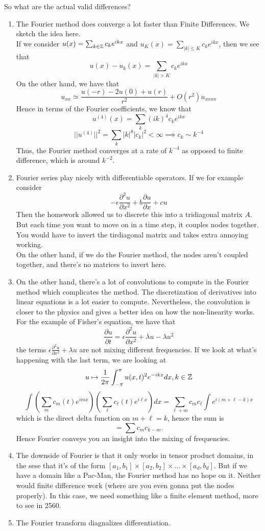 \documentclass{article}
\begin{document}
So what are the actual valid differences?
\begin{enumerate}
    \item The Fourier method does converge a lot faster than Finite Differences. We sketch the idea here.\\
    
    If we consider $u(x) = \sum_{k \in \mathbb{Z}} c_k e^{ikx}$ and $u_K(x) = \sum_{|k| \leq K} c_k e^{ikx}$, then we see that
    \[u(x) - u_k(x) = \sum_{|k|>K} c_k e^{ikx}\]
    On the other hand, we have that
    \[u_{xx} \simeq \frac{u(-r) - 2 u(0) + u(r)}{r^2} + O(r^2) u_{xxxx}\]
    Hence in terms of the Fourier coefficients, we know that
    \[u^{(4)}(x) = \sum_k (ik)^4 c_k e^{ikx} \]
    \[||u^{(4)}||^2 = \sum_k |k|^8 |c_k|^2 < \infty \implies c_k \sim k^{-4}\]
    Thus, the Fourier method converges at a rate of $k^{-4}$ as opposed to finite difference, which is around $k^{-2}$.
    \item Fourier series play nicely with differentiable operators. If we for example consider
    \[-\epsilon \frac{\partial^2 u}{\partial x^2} + b \frac{\partial u}{\partial x} + c u\]
    Then the homework allowed us to discrete this into a tridiagonal matrix $A$. But each time you want to move on in a time step, it couples nodes together. You would have to invert the tirdiagonal matrix and takes extra annoying working.\\

    On the other hand, if we do the Fourier method, the nodes aren't coupled together, and there's no matrices to invert here.
    \item On the other hand, there's a lot of convolutions to compute in the Fourier method which complicates the method. The discretization of derivatives into linear equations is a lot easier to compute. Nevertheless, the convolution is closer to the physics and gives a better idea on how the non-linearity works. For the example of Fisher's equation, we have that
    \[\frac{\partial u}{\partial t} = \epsilon \frac{\partial^2 u}{\partial x^2} + \lambda u - \lambda u^2 \]
    the terms $\epsilon \frac{\partial^2 u}{\partial x^2} + \lambda u$ are not mixing different frequencies. If we look at what's happening with the last term, we are looking at
    \[u \mapsto \frac{1}{2\pi} \int_{-\pi}^{\pi} u(x, t)^2 e^{-ikx} dx, k \in \mathbb{Z}\]
    \[\int (\sum_m c_m(t) e^{imx} ) (\sum_\ell c_\ell(t) e^{i\ell x}) dx = \sum_{\ell + m} c_m c_\ell \int e^{i(m + \ell - k)x}\]
    which is the direct delta function on $m + \ell = k$, hence the sum is
    \[= \sum c_m c_{k - m}.\]
    Hence Fourier conveys you an insight into the mixing of frequencies.
    \item The downside of Fourier is that it only works in tensor product domains, in the sese that it's of the form $[a_1, b_1] \times [a_2, b_2] \times ... \times [a_d, b_d]$. But if we have a domain like a Pac-Man, the Fourier method has no hope on it. Neither would finite difference work (where are you even gonna put the nodes properly). In this case, we need something like a finite element method, more to see in 2560.
    \item The Fourier transform diagnalizes differentiation.
\end{enumerate}
\end{document}
